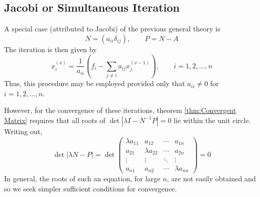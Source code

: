 \documentclass[../main.tex]{subfiles}
\begin{document}
\subsection{Jacobi or Simultaneous Iteration}
A special case (attributed to Jacobi) of the previous general theory is
\begin{equation}
	N = (a_{ii} \delta_{ij}), \qquad P = N - A
\end{equation}
The iteration is then given by
\begin{equation}
	x_i^{(\nu)} = \frac{1}{a_{ii}} \left( f_i - \sum_{j \neq i} a_{ij} x_j^{(\nu-1)} \right), \qquad i = 1, 2, \ldots, n
\end{equation}
Thus, this procedure may be employed provided only that $a_{ii} \neq 0$ for $i = 1, 2, \ldots, n$.

However, for the convergence of these iterations, theorem \ref{thm:Convergent Matrix} requires that all roots of $\det | \lambda I - N^{-1} P | = 0$ lie within the unit circle. Writing out,
\begin{equation*}
	\det | \lambda N - P | = \det
	\begin{pmatrix}
		\lambda a_{11} & a_{12}         & \cdots & a_{1n}         \\
		a_{21}         & \lambda a_{22} & \cdots & a_{2n}         \\
		\vdots         & \vdots         & \ddots & \vdots         \\
		a_{n1}         & a_{n2}         & \cdots & \lambda a_{nn}
	\end{pmatrix} = 0
\end{equation*}
In general, the roots of such an equation, for large $n$, are not easily obtained and so we seek simpler sufficient conditions for convergence.
\end{document}
